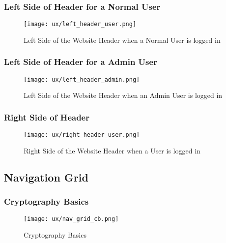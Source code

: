 \subsubsection{Left Side of Header for a Normal User}
\begin{figure}[H]
\begin{center}
\texttt{[image: ux/left\_header\_user.png]}
\end{center} 
\caption{Left Side of the Website Header when a Normal User is logged in}
\label{ux_left_header_user}
\end{figure}

\subsubsection{Left Side of Header for a Admin User}
\begin{figure}[H]
\begin{center}
\texttt{[image: ux/left\_header\_admin.png]}
\end{center} 
\caption{Left Side of the Website Header when an Admin User is logged in}
\label{ux_left_header_admin}
\end{figure}

\subsubsection{Right Side of Header}
\begin{figure}[H]
\begin{center}
\texttt{[image: ux/right\_header\_user.png]}
\end{center} 
\caption{Right Side of the Website Header when a User is logged in}
\label{ux_right_header_user}
\end{figure}


\subsection{Navigation Grid}

\subsubsection{Cryptography Basics}
\begin{figure}[H]
\begin{center}
\texttt{[image: ux/nav\_grid\_cb.png]}
\end{center} 
\caption{Cryptography Basics}
\label{ux_cb}
\end{figure}

